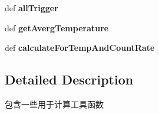 \begin{DoxyCompactItemize}
\item 
\mbox{\label{namespaceMIS_1_1DatabaseTool_1_1dataLayer_1_1calculationTools_a65dc6acef1e019fc7827383200604ceb}} 
def {\bfseries all\+Trigger}
\item 
\mbox{\label{namespaceMIS_1_1DatabaseTool_1_1dataLayer_1_1calculationTools_a9803e16243e2ef0aeafed8ee37871f78}} 
def {\bfseries get\+Averg\+Temperature}
\item 
\mbox{\label{namespaceMIS_1_1DatabaseTool_1_1dataLayer_1_1calculationTools_aa3624533d47eb5a2d2752f222405eea2}} 
def {\bfseries calculate\+For\+Temp\+And\+Count\+Rate}
\end{DoxyCompactItemize}


\subsection{Detailed Description}
\begin{DoxyVerb}包含一些用于计算工具函数
\end{DoxyVerb}
 